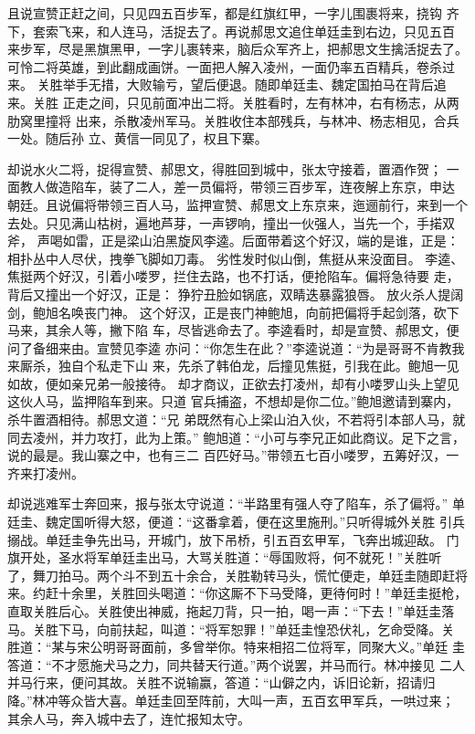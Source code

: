 且说宣赞正赶之间，只见四五百步军，都是红旗红甲，一字儿围裹将来，挠钩
齐下，套索飞来，和人连马，活捉去了。再说郝思文追住单廷圭到右边，只见五百
来步军，尽是黑旗黑甲，一字儿裹转来，脑后众军齐上，把郝思文生擒活捉去了。
可怜二将英雄，到此翻成画饼。一面把人解入凌州，一面仍率五百精兵，卷杀过来。
关胜举手无措，大败输亏，望后便退。随即单廷圭、魏定国拍马在背后追来。关胜
正走之间，只见前面冲出二将。关胜看时，左有林冲，右有杨志，从两肋窝里撞将
出来，杀散凌州军马。关胜收住本部残兵，与林冲、杨志相见，合兵一处。随后孙
立、黄信一同见了，权且下寨。

却说水火二将，捉得宣赞、郝思文，得胜回到城中，张太守接着，置酒作贺；
一面教人做造陷车，装了二人，差一员偏将，带领三百步军，连夜解上东京，申达
朝廷。且说偏将带领三百人马，监押宣赞、郝思文上东京来，迤逦前行，来到一个
去处。只见满山枯树，遍地芦芽，一声锣响，撞出一伙强人，当先一个，手掿双斧，
声喝如雷，正是梁山泊黑旋风李逵。后面带着这个好汉，端的是谁，正是：
相扑丛中人尽伏，拽拳飞脚如刀毒。
劣性发时似山倒，焦挺从来没面目。
李逵、焦挺两个好汉，引着小喽罗，拦住去路，也不打话，便抢陷车。偏将急待要
走，背后又撞出一个好汉，正是：
狰狞丑脸如锅底，双睛迭暴露狼唇。
放火杀人提阔剑，鲍旭名唤丧门神。
这个好汉，正是丧门神鲍旭，向前把偏将手起剑落，砍下马来，其余人等，撇下陷
车，尽皆逃命去了。李逵看时，却是宣赞、郝思文，便问了备细来由。宣赞见李逵
亦问：“你怎生在此？”李逵说道：“为是哥哥不肯教我来厮杀，独自个私走下山
来，先杀了韩伯龙，后撞见焦挺，引我在此。鲍旭一见如故，便如亲兄弟一般接待。
却才商议，正欲去打凌州，却有小喽罗山头上望见这伙人马，监押陷车到来。只道
官兵捕盗，不想却是你二位。”鲍旭邀请到寨内，杀牛置酒相待。郝思文道：“兄
弟既然有心上梁山泊入伙，不若将引本部人马，就同去凌州，并力攻打，此为上策。”
鲍旭道：“小可与李兄正如此商议。足下之言，说的最是。我山寨之中，也有三二
百匹好马。”带领五七百小喽罗，五筹好汉，一齐来打凌州。

却说逃难军士奔回来，报与张太守说道：“半路里有强人夺了陷车，杀了偏将。”
单廷圭、魏定国听得大怒，便道：“这番拿着，便在这里施刑。”只听得城外关胜
引兵搦战。单廷圭争先出马，开城门，放下吊桥，引五百玄甲军，飞奔出城迎敌。
门旗开处，圣水将军单廷圭出马，大骂关胜道：“辱国败将，何不就死！”关胜听
了，舞刀拍马。两个斗不到五十余合，关胜勒转马头，慌忙便走，单廷圭随即赶将
来。约赶十余里，关胜回头喝道：“你这厮不下马受降，更待何时！”单廷圭挺枪，
直取关胜后心。关胜使出神威，拖起刀背，只一拍，喝一声：“下去！”单廷圭落
马。关胜下马，向前扶起，叫道：“将军恕罪！”单廷圭惶恐伏礼，乞命受降。关
胜道：“某与宋公明哥哥面前，多曾举你。特来相招二位将军，同聚大义。”单廷
圭答道：“不才愿施犬马之力，同共替天行道。”两个说罢，并马而行。林冲接见
二人并马行来，便问其故。关胜不说输赢，答道：“山僻之内，诉旧论新，招请归
降。”林冲等众皆大喜。单廷圭回至阵前，大叫一声，五百玄甲军兵，一哄过来；
其余人马，奔入城中去了，连忙报知太守。

